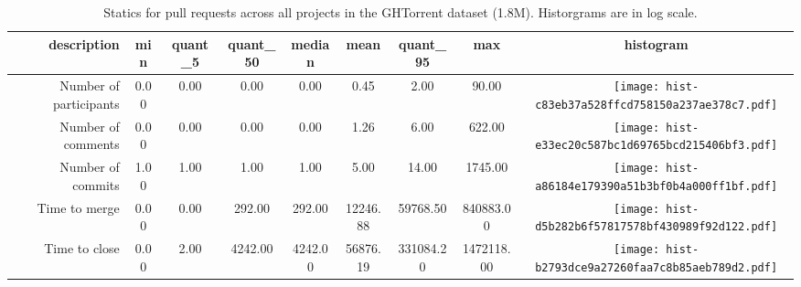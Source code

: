 \begin{table*}[ht]
\centering
\begin{tabular}{rcccccccc}
  \hline
description & min & quant\_5 & quant\_50 & median & mean & quant\_95 & max & histogram \\ 
  \hline
Number of participants & 0.00 & 0.00 & 0.00 & 0.00 & 0.45 & 2.00 & 90.00 & \texttt{[image: hist-c83eb37a528ffcd758150a237ae378c7.pdf]} \\ 
  Number of comments & 0.00 & 0.00 & 0.00 & 0.00 & 1.26 & 6.00 & 622.00 & \texttt{[image: hist-e33ec20c587bc1d69765bcd215406bf3.pdf]} \\ 
  Number of commits & 1.00 & 1.00 & 1.00 & 1.00 & 5.00 & 14.00 & 1745.00 & \texttt{[image: hist-a86184e179390a51b3bf0b4a000ff1bf.pdf]} \\ 
  Time to merge & 0.00 & 0.00 & 292.00 & 292.00 & 12246.88 & 59768.50 & 840883.00 & \texttt{[image: hist-d5b282b6f57817578bf430989f92d122.pdf]} \\ 
  Time to close & 0.00 & 2.00 & 4242.00 & 4242.00 & 56876.19 & 331084.20 & 1472118.00 & \texttt{[image: hist-b2793dce9a27260faa7c8b85aeb789d2.pdf]} \\ 
   \hline
\end{tabular}
\caption{Statics for pull requests across all projects in the GHTorrent dataset (1.8M). Historgrams are in log scale.} 
\label{tab.overall.stats}
\end{table*}
